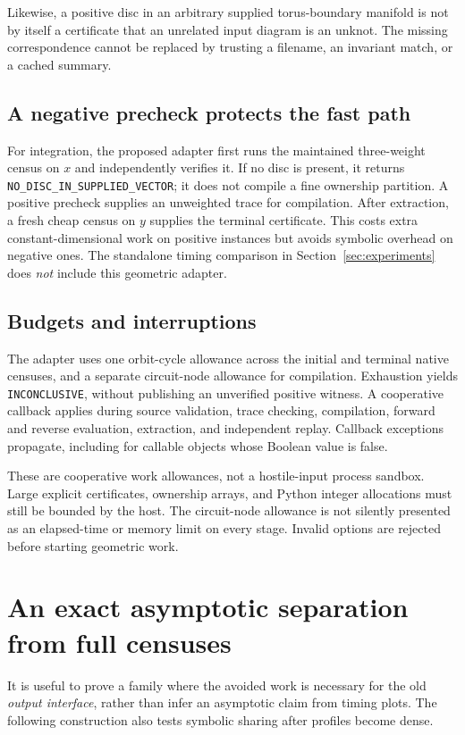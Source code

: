 \documentclass[11pt]{article}
\theoremstyle{definition}\newtheorem{definition}[theorem]{Definition}
\theoremstyle{remark}\newtheorem{remark}[theorem]{Remark}
\begin{document}
Likewise, a positive disc in an arbitrary supplied torus-boundary manifold is
not by itself a certificate that an unrelated input diagram is an unknot. The
missing correspondence cannot be replaced by trusting a filename, an invariant
match, or a cached summary.

\subsection{A negative precheck protects the fast path}
For integration, the proposed adapter first runs the maintained three-weight
census on $x$ and independently verifies it. If no disc is present, it returns
\texttt{NO\_DISC\_IN\_SUPPLIED\_VECTOR}; it does not compile a fine ownership
partition. A positive precheck supplies an unweighted trace for compilation.
After extraction, a fresh cheap census on $y$ supplies the terminal certificate.
This costs extra constant-dimensional work on positive instances but avoids
symbolic overhead on negative ones. The standalone timing comparison in
Section~\ref{sec:experiments} does \emph{not} include this geometric adapter.

\subsection{Budgets and interruptions}
The adapter uses one orbit-cycle allowance across the initial and terminal
native censuses, and a separate circuit-node allowance for compilation.
Exhaustion yields \texttt{INCONCLUSIVE}, without publishing an unverified
positive witness. A cooperative callback applies during source validation,
trace checking, compilation, forward and reverse evaluation, extraction, and
independent replay. Callback exceptions propagate, including for callable
objects whose Boolean value is false.

These are cooperative work allowances, not a hostile-input process sandbox.
Large explicit certificates, ownership arrays, and Python integer allocations
must still be bounded by the host. The circuit-node allowance is not silently
presented as an elapsed-time or memory limit on every stage. Invalid options
are rejected before starting geometric work.

\section{An exact asymptotic separation from full censuses}
\label{sec:separation}

It is useful to prove a family where the avoided work is necessary for the old
\emph{output interface}, rather than infer an asymptotic claim from timing plots.
The following construction also tests symbolic sharing after profiles become
dense.
\end{document}
